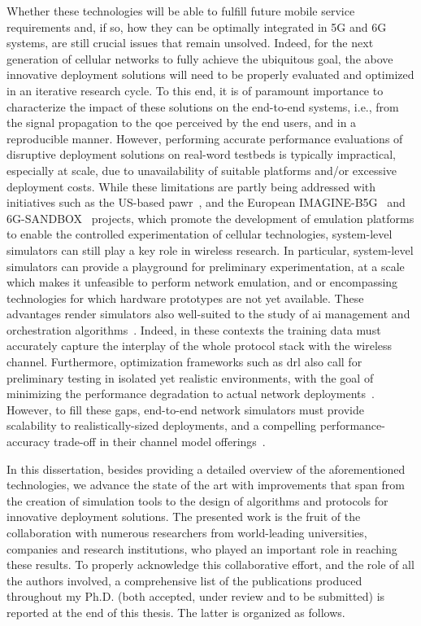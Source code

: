 Whether these technologies will be able to fulfill future mobile service requirements and, if so, how they can be optimally integrated in 5G and 6G systems, are still crucial issues that remain unsolved. 
Indeed, for the next generation of cellular networks to fully achieve the ubiquitous goal, the above innovative deployment solutions will need to be properly evaluated and optimized in an iterative research cycle. To this end, it is of paramount importance to characterize the impact of these solutions on the end-to-end systems, i.e., from the signal propagation to the \gls{qoe} perceived by the end users, and in a reproducible manner.
However, performing accurate performance evaluations of disruptive deployment solutions on real-word testbeds is typically impractical, especially at scale, due to unavailability of suitable platforms and/or excessive deployment costs.
While these limitations are partly being addressed with initiatives such as the US-based \gls{pawr}~\cite{BONATI2023109502}, and the European IMAGINE-B5G~\cite{10597052} and 6G-SANDBOX~\cite{10597112} projects, which promote the development of emulation platforms to enable the controlled experimentation of cellular technologies, system-level simulators can still play a key role in wireless research.
In particular, system-level simulators can provide a playground for preliminary experimentation, at a scale which makes it unfeasible to perform network emulation, and or encompassing technologies for which hardware prototypes are not yet available. 
These advantages render simulators also well-suited to the study of \gls{ai} management and orchestration algorithms~\cite{polese2022colo}.
Indeed, in these contexts the training data must accurately capture the interplay of the whole protocol stack with the wireless channel. Furthermore, optimization frameworks such as \gls{drl} also call for preliminary testing in isolated yet realistic environments, with the goal of minimizing the performance degradation to actual network deployments~\cite{lacava2022programmable, amir2023safehaul}.
However, to fill these gaps, end-to-end network simulators must provide scalability to realistically-sized deployments, and a compelling performance-accuracy trade-off in their channel model offerings~\cite{testolina2020scalable}.

In this dissertation, besides providing a detailed overview of the aforementioned technologies, we advance the state of the art with improvements that span from the creation of simulation tools to the design of algorithms and protocols for innovative deployment solutions.
The presented work is the fruit of the collaboration with numerous researchers from world-leading universities, companies and research institutions, who played an important role in reaching these results. To properly acknowledge this collaborative effort, and the role of all the
authors involved, a comprehensive list of the publications produced throughout my Ph.D. (both accepted, under review and to be submitted) is reported at the end of this thesis. The latter is organized as follows.

